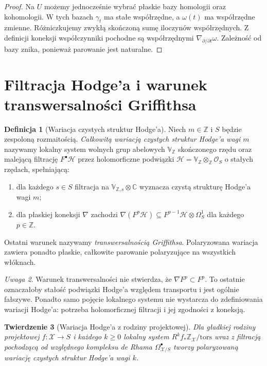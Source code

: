 \documentclass[11pt,a4paper,oneside]{report}
\newcommand{\C}{\mathbb{C}}
\newcommand{\Z}{\mathbb{Z}}
\theoremstyle{plain}
\newtheorem{twierdzenie}{Twierdzenie}[section]
\theoremstyle{definition}
\newtheorem{definicja}[twierdzenie]{Definicja}
\theoremstyle{remark}
\newtheorem{uwaga}[twierdzenie]{Uwaga}
\begin{document}
\begin{proof}
Na $U$ możemy jednocześnie wybrać płaskie bazy homologii
oraz kohomologii. W tych bazach $\gamma_t$ ma stałe
współrzędne, a $\omega(t)$ ma współrzędne zmienne.
Różniczkujemy zwykłą skończoną sumę iloczynów współrzędnych.
Z definicji koneksji współczynniki pochodne są współrzędnymi
$\nabla_{\partial/\partial t}\omega$. Zależność od bazy
znika, ponieważ parowanie jest naturalne.
\end{proof}

\section{Filtracja Hodge'a i warunek transwersalności Griffithsa}
\begin{definicja}[Wariacja czystych struktur Hodge'a]
Niech $m\in\Z$ i $S$ będzie zespoloną rozmaitością.
\emph{Całkowitą wariacją czystych struktur Hodge'a wagi $m$}
nazywamy lokalny system wolnych grup abelowych
$\mathbb V_{\Z}$ skończonego rzędu oraz malejącą
filtrację $F^\bullet\mathcal H$ przez holomorficzne
podwiązki $\mathcal H=\mathbb V_{\Z}\otimes_{\Z}\mathcal O_S$
o stałych rzędach, spełniającą:
\begin{enumerate}[label=\textup{(\roman*)},leftmargin=*]
\item dla każdego $s\in S$ filtracja na
$\mathbb V_{\Z,s}\otimes\C$ wyznacza czystą strukturę Hodge'a wagi $m$;
\item dla płaskiej koneksji $\nabla$ zachodzi
$\nabla(F^p\mathcal H)\subseteq
F^{p-1}\mathcal H\otimes\Omega_S^1$ dla każdego $p\in\Z$.
\end{enumerate}
Ostatni warunek nazywamy \emph{transwersalnością Griffithsa}.
Polaryzowana wariacja zawiera ponadto płaskie, całkowite
parowanie polaryzujące na wszystkich włóknach.
\end{definicja}
\begin{uwaga}
Warunek transwersalności nie stwierdza, że
$\nabla F^p\subset F^p$. To ostatnie oznaczałoby
stałość podwiązki Hodge'a względem transportu i jest
ogólnie fałszywe. Ponadto samo pojęcie lokalnego systemu
nie wystarcza do zdefiniowania wariacji Hodge'a: potrzeba
holomorficznej filtracji i jej zgodności z koneksją.
\end{uwaga}
\begin{twierdzenie}[Wariacja Hodge'a z rodziny projektowej]
\label{thm:xv-vhs-family}
Dla gładkiej rodziny projektowej $f:\mathcal X\to S$
i każdego $k\ge0$ lokalny system
$R^kf_*\Z_{\mathcal X}/\mathrm{tors}$ wraz z filtracją
pochodzącą od względnego kompleksu de Rhama
$\Omega^\bullet_{\mathcal X/S}$ tworzy polaryzowaną
wariację czystych struktur Hodge'a wagi $k$.
\end{twierdzenie}
\end{document}
